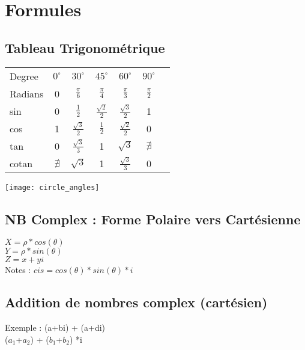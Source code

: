 
\newpage
\chapter{Formules}

\section{Tableau Trigonométrique}
\begin{tabular}{|l|c|c|c|c|c|c|}
  \hline
  Degree & $0^{\circ}$ & $30^{\circ}$ & $45^{\circ}$  & $60^{\circ}$ & $90^{\circ}$ \\
  Radians & 0 & $\frac{\pi}{6}$ & $\frac{\pi}{4}$ & $\frac{\pi}{3}$ &  $\frac{\pi}{2}$ \\
  \hline
  sin & 0 & $\frac{1}{2}$ & $\frac{\sqrt{2}} {2}$ & $\frac{\sqrt{3}} {2}$ & 1 \\
  cos & 1 & $\frac{\sqrt{3}} {2}$ & $\frac{1}{2}$ & $\frac{\sqrt{2}} {2}$ & 0 \\
  tan & 0 & $\frac{\sqrt{3}} {3}$ & 1 & $\sqrt{3}$ & $\nexists$ \\
  cotan & $\nexists$ & $\sqrt{3}$ & 1 & $\frac{\sqrt{3}} {3}$ & 0 \\
  \hline
\end{tabular}

\vspace{4mm} %
\texttt{[image: circle\_angles]}

\newpage
\section{NB Complex : Forme Polaire vers Cartésienne}
$X= \rho * cos(\theta)$ \\
$Y= \rho * sin(\theta)$ \\
$Z= x+yi $ \\
Notes : $cis = cos(\theta) * sin(\theta) *i$ \\

\vspace{4mm} %
\section{Addition de nombres complex (cartésien)}

Exemple : (a+bi) + (a+di) \\

($a_1$+$a_2$) + ($b_1$+$b_2$) *i \\

\vspace{4mm} %
